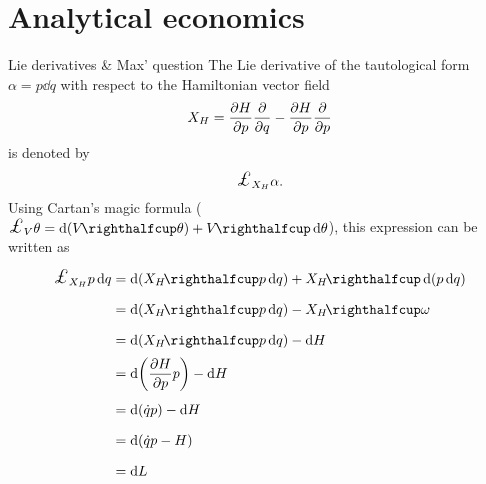 \chapter{Analytical economics}

\begin{aside}{Lie derivatives \& Max' question}
    The Lie derivative of the tautological form $\alpha = p\dd{q}$ with respect to the
    Hamiltonian vector field
    $$ X_H = \pdv{H}{p}\pdv{}{q} - \pdv{H}{p}\pdv{}{p}$$
    is denoted by
    $$ \lied{X_H}{\alpha}.$$
    Using Cartan's magic formula ($ \lied{V}{\theta} = \dd{(\intpr{V}{\theta})} + \intpr{V}{\dd{\theta}}$), this expression
    can be written as
    \begin{equation*} 
        \begin{split}
            \lied{X_H}{p\dd{q}} &= \dd{(\intpr{X_H}{p\dd{q}})} + \intpr{X_H}{\dd{(p\dd{q})}} \\
                                &= \dd{(\intpr{X_H}{p\dd{q}})} - \intpr{X_H}{\omega} \\
                                &= \dd{(\intpr{X_H}{p\dd{q}})} - \dd{H} \\
                                &= \dd{\qty(\pdv{H}{p}p)} - \dd{H} \\
                                &= \dd{(\dot{q}p)} - \dd{H} \\
                                &= \dd{(\dot{q}p - H)} \\
                                &= \dd{L} \\
        \end{split}
    \end{equation*}


\end{aside}
